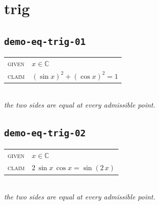 \documentclass[11pt]{article}
\begin{document}
\section*{trig}
\subsection*{\texttt{demo-eq-trig-01}}
\begin{tabular}{@{}l@{\quad}l@{}}
\textsc{given} & $x \in \mathbb{C}$ \\[4pt]
\textsc{claim} & $\displaystyle \left(\sin x\right)^{2} + \left(\cos x\right)^{2} = 1$ \\
\end{tabular}\\[2pt]
{\small\emph{the two sides are equal at every admissible point.}}\\

\subsection*{\texttt{demo-eq-trig-02}}
\begin{tabular}{@{}l@{\quad}l@{}}
\textsc{given} & $x \in \mathbb{C}$ \\[4pt]
\textsc{claim} & $\displaystyle 2 \, \sin x \, \cos x = \sin\left(2 \, x\right)$ \\
\end{tabular}\\[2pt]
{\small\emph{the two sides are equal at every admissible point.}}\\
\end{document}

